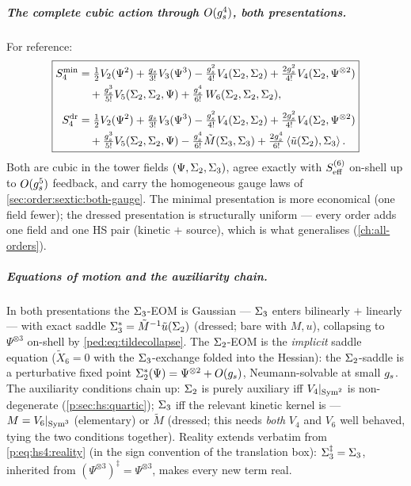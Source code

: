 \subparagraph{The complete cubic action through $O(g_s^4)$, both presentations.} For
reference:
\begin{equation}
	\boxed{
	\begin{aligned}
	S^{\rm min}_4
	&= \tfrac12V_2(\Psi^2)+\tfrac{g_s}{3!}V_3(\Psi^3)
	-\tfrac{g_s^2}{4!}V_4(\Sigma_2,\Sigma_2)+\tfrac{2g_s^2}{4!}V_4(\Sigma_2,\Psi^{\otimes2})
	\\&\quad
	+\tfrac{g_s^3}{5!}V_5(\Sigma_2,\Sigma_2,\Psi)
	+\tfrac{g_s^4}{6!}\,W_6(\Sigma_2,\Sigma_2,\Sigma_2),
	\\[1ex]
	S^{\rm dr}_4
	&= \tfrac12V_2(\Psi^2)+\tfrac{g_s}{3!}V_3(\Psi^3)
	-\tfrac{g_s^2}{4!}V_4(\Sigma_2,\Sigma_2)+\tfrac{2g_s^2}{4!}V_4(\Sigma_2,\Psi^{\otimes2})
	\\&\quad
	+\tfrac{g_s^3}{5!}V_5(\Sigma_2,\Sigma_2,\Psi)
	-\tfrac{g_s^4}{6!}\tilde M(\Sigma_3,\Sigma_3)+\tfrac{2g_s^4}{6!}\left \langle \tilde u(\Sigma_2),\Sigma_3 \right \rangle.
	\end{aligned}
	}
	\label{ped:eq:S4both}
\end{equation}
Both are cubic in the tower fields $(\Psi,\Sigma_2,\Sigma_3)$, agree exactly with
$S^{(6)}_{\rm eff}$ on-shell up to $O(g_s^5)$ feedback, and carry the homogeneous gauge
laws of \cref{sec:order:sextic:both-gauge}. The minimal presentation is more economical (one field
fewer); the dressed presentation is structurally uniform --- every order adds one field and
one HS pair (kinetic $+$ source), which is what generalises
(\cref{ch:all-orders}).

\subparagraph{Equations of motion and the auxiliarity chain.} In both presentations the
$\Sigma_3$-EOM is Gaussian --- $\Sigma_3$ enters bilinearly $+$ linearly --- with exact saddle
$\Sigma_3^*=\tilde M^{-1}\tilde u(\Sigma_2)$ (dressed; bare with $M,u$), collapsing to
$\Psi^{\otimes3}$ on-shell by \eqref{ped:eq:tildecollapse}. The $\Sigma_2$-EOM is the
\emph{implicit} saddle equation ($\tilde X_6=0$ with the $\Sigma_3$-exchange
folded into the Hessian): the $\Sigma_2$-saddle is a perturbative fixed point
$\Sigma_2^*(\Psi)=\Psi^{\otimes2}+O(g_s)$, Neumann-solvable at small $g_s$. The auxiliarity
conditions chain up: $\Sigma_2$ is purely auxiliary iff $V_4|_{\operatorname{Sym}^2}$ is non-degenerate
(\cref{p:sec:hs:quartic}); $\Sigma_3$ iff the relevant kinetic kernel is --- $M=V_6|_{\operatorname{Sym}^3}$
(elementary) or $\tilde M$ (dressed; this needs \emph{both} $V_4$ and $V_6$ well behaved,
tying the two conditions together). Reality extends verbatim from
\cref{p:eq:hs4:reality} (in the sign convention of the translation box): $\Sigma_3^\ddagger=\Sigma_3$, inherited from
$(\Psi^{\otimes3})^\ddagger=\Psi^{\otimes3}$, makes every new term real.

